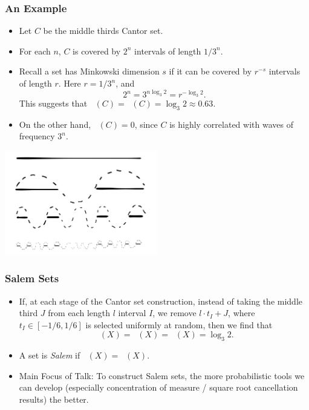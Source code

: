\documentclass[usenames,dvipsnames,handout]{beamer}
\DeclareMathOperator{\fordim}{\text{dim}_{\textbf{F}}}
\DeclareMathOperator{\hausdim}{\text{dim}_{\textbf{H}}}
\DeclareMathOperator{\minkdim}{\text{dim}_{\textbf{M}}}
\begin{document}
\begin{frame}
    \frametitle{An Example}

    \begin{itemize}
        \item Let $C$ be the middle thirds Cantor set.

        \item For each $n$, $C$ is covered by $2^n$ intervals of length $1/3^n$.

        \item Recall a set has Minkowski dimension $s$ if it can be covered by $r^{-s}$ intervals of length $r$. Here $r = 1/3^n$, and
        \[ 2^n = 3^{n \log_3 2} = r^{- \log_3 2}. \]
        This suggests that $\hausdim(C) = \minkdim(C) = \log_3 2 \approx 0.63$.

        \item On the other hand, $\fordim(C) = 0$, since $C$ is highly correlated with waves of frequency $3^n$.
    \end{itemize}

        \begin{center}
    \includegraphics[width=0.5\textwidth]{../Images/CantorSetFourier}
    \end{center}
\end{frame}





\begin{frame}
    \frametitle{Salem Sets}

    \begin{itemize}
        \item If, at each stage of the Cantor set construction, instead of taking the middle third $J$ from each length $l$ interval $I$, we remove $l \cdot t_I + J$, where $t_I \in [-1/6,1/6]$ is selected uniformly at random, then we find that
        \[ \fordim(X) = \hausdim(X) = \minkdim(X) = \log_3 2. \]

        \item A set is \emph{Salem} if $\fordim(X) = \hausdim(X)$.

        \item Main Focus of Talk: To construct Salem sets, the more probabilistic tools we can develop (especially concentration of measure / square root cancellation results) the better.
    \end{itemize}
\end{frame}
\end{document}
